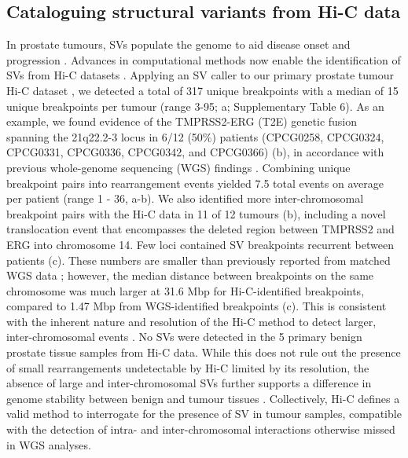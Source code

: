 \subsection{Cataloguing structural variants from Hi-C data}

In prostate tumours, SVs populate the genome to aid disease onset and progression \cite{fraserGenomicHallmarksLocalized2017,quigleyGenomicHallmarksStructural2018}.
Advances in computational methods now enable the identification of SVs from Hi-C datasets \cite{dixonIntegrativeDetectionAnalysis2018,hoStructuralVariationSequencing2019}.
Applying an SV caller to our primary prostate tumour Hi-C dataset \cite{dixonIntegrativeDetectionAnalysis2018}, we detected a total of 317 unique breakpoints with a median of 15 unique breakpoints per tumour (range 3-95; a; Supplementary Table 6).
As an example, we found evidence of the TMPRSS2-ERG (T2E) genetic fusion spanning the 21q22.2-3 locus in 6/12 (50\%) patients (CPCG0258, CPCG0324, CPCG0331, CPCG0336, CPCG0342, and CPCG0366) (b), in accordance with previous whole-genome sequencing (WGS) findings \cite{fraserGenomicHallmarksLocalized2017}.
Combining unique breakpoint pairs into rearrangement events yielded 7.5 total events on average per patient (range 1 - 36, a-b).
We also identified more inter-chromosomal breakpoint pairs with the Hi-C data in 11 of 12 tumours (b), including a novel translocation event that encompasses the deleted region between TMPRSS2 and ERG into chromosome 14.
Few loci contained SV breakpoints recurrent between patients (c).
These numbers are smaller than previously reported from matched WGS data \cite{fraserGenomicHallmarksLocalized2017}; however, the median distance between breakpoints on the same chromosome was much larger at 31.6 Mbp for Hi-C-identified breakpoints, compared to 1.47 Mbp from WGS-identified breakpoints (c).
This is consistent with the inherent nature and resolution of the Hi-C method to detect larger, inter-chromosomal events \cite{dixonIntegrativeDetectionAnalysis2018}.
No SVs were detected in the 5 primary benign prostate tissue samples from Hi-C data.
While this does not rule out the presence of small rearrangements undetectable by Hi-C limited by its resolution, the absence of large and inter-chromosomal SVs further supports a difference in genome stability between benign and tumour tissues \cite{fraserGenomicHallmarksLocalized2017,bergerGenomicComplexityPrimary2011,bacaPunctuatedEvolutionProstate2013,mazrooeiCistromePartitioningReveals2019}.
Collectively, Hi-C defines a valid method to interrogate for the presence of SV in tumour samples, compatible with the detection of intra- and inter-chromosomal interactions otherwise missed in WGS analyses.

